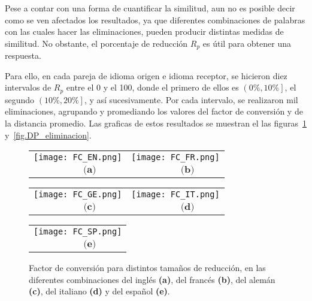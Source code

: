 
Pese a contar con una forma de cuantificar la similitud, aun no es posible decir como se ven afectados los resultados, ya que diferentes combinaciones de palabras con las cuales hacer las eliminaciones, pueden producir distintas medidas de similitud.  No obstante, el porcentaje de reducción $R_{p}$ es útil para obtener una respuesta.

Para ello, en cada pareja de idioma origen e idioma receptor, se hicieron diez intervalos de $R_{p}$ entre el 0 y el 100, donde el primero de ellos es $\left(0\%, 10\% \right]$, el segundo $\left(10\%, 20\% \right]$, y así sucesivamente. Por cada intervalo,  se realizaron mil eliminaciones, agrupando y promediando los valores del factor de conversión y de la distancia promedio. Las graficas de estos resultados se muestran el las figuras~\ref{fig.FC_eliminacion} y~\ref{fig.DP_eliminacion}.


\begin{figure}[h!] 
	\centering
	\begin{tabular}{cc}
		\texttt{[image: FC\_EN.png]} &
		\texttt{[image: FC\_FR.png]} \\
		$\,\,\,\,\,\,\,\,\,\,\,\,\,\,\, \textbf{(a)}$      & 
		$\,\,\,\,\,\,\,\,\,\,\,\,\,\,\, \textbf{(b)}$     \\
	\end{tabular}
	
	\begin{tabular}{cc}
		\texttt{[image: FC\_GE.png]} &
		\texttt{[image: FC\_IT.png]} \\
		$\,\,\,\,\,\,\,\,\,\,\,\,\,\,\, \textbf{(c)}$      & $\,\,\,\,\,\,\,\,\,\,\,\,\,\,\, \textbf{(d)}$     \\
	\end{tabular}
	\begin{tabular}{c}
		\texttt{[image: FC\_SP.png]} \\
		$\,\,\,\,\,\,\,\,\,\,\,\,\,\,\, \textbf{(e)}$     \\
	\end{tabular}
	\caption{Factor de conversión para distintos tamaños de reducción, en las diferentes combinaciones del inglés \textbf{(a)}, del francés \textbf{(b)}, del alemán \textbf{(c)}, del italiano \textbf{(d)} y del español \textbf{(e)}.}
	\label{fig.FC_eliminacion}
\end{figure} 


